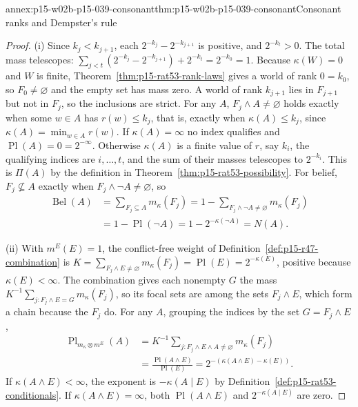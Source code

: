 \begin{annexitem}{annex:p15-w02b-p15-039-consonant}{thm:p15-w02b-p15-039-consonant}{Consonant ranks and Dempster's rule}
\begin{proof}
(i) Since \(k_j<k_{j+1}\), each \(2^{-k_j}-2^{-k_{j+1}}\) is positive, and
\(2^{-k_t}>0\).  The total mass telescopes:
\(\sum_{j<t}(2^{-k_j}-2^{-k_{j+1}})+2^{-k_t}=2^{-k_0}=1\).  Because
\(\kappa(W)=0\) and \(W\) is finite, Theorem~\ref{thm:p15-rat53-rank-laws}
gives a world of rank \(0=k_0\), so \(F_0\ne\varnothing\) and the empty set
has mass zero.  A world of rank \(k_{j+1}\) lies in \(F_{j+1}\) but not in
\(F_j\), so the inclusions are strict.  For any \(A\),
\(F_j\land A\ne\varnothing\) holds exactly when some \(w\in A\) has
\(r(w)\leq k_j\), that is, exactly when \(\kappa(A)\leq k_j\), since
\(\kappa(A)=\min_{w\in A}r(w)\).  If \(\kappa(A)=\infty\) no index
qualifies and \(\operatorname{Pl}(A)=0=2^{-\infty}\).  Otherwise
\(\kappa(A)\) is a finite value of \(r\), say \(k_i\), the qualifying
indices are \(i,\ldots,t\), and the sum of their masses telescopes to
\(2^{-k_i}\).  This is \(\Pi(A)\) by the definition in
Theorem~\ref{thm:p15-rat53-possibility}.  For belief,
\(F_j\not\subseteq A\) exactly when \(F_j\land\neg A\ne\varnothing\), so
\[
\begin{aligned}
 \operatorname{Bel}(A)&=\sum_{F_j\subseteq A}m_\kappa(F_j)
 =1-\sum_{F_j\land\neg A\ne\varnothing}m_\kappa(F_j)\\
 &=1-\operatorname{Pl}(\neg A)=1-2^{-\kappa(\neg A)}=N(A).
\end{aligned}
\]

(ii) With \(m^E(E)=1\), the conflict-free weight of
Definition~\ref{def:p15-r47-combination} is
\(K=\sum_{F_j\land E\ne\varnothing}m_\kappa(F_j)=\operatorname{Pl}(E)=2^{-\kappa(E)}\),
positive because \(\kappa(E)<\infty\).  The combination gives each nonempty
\(G\) the mass \(K^{-1}\sum_{j:F_j\land E=G}m_\kappa(F_j)\), so its focal
sets are among the sets \(F_j\land E\), which form a chain because the
\(F_j\) do.  For any \(A\), grouping the indices by the set
\(G=F_j\land E\),
\[
\begin{aligned}
 \operatorname{Pl}_{m_\kappa\otimes m^E}(A)
 &=K^{-1}\sum_{j:F_j\land E\land A\ne\varnothing}m_\kappa(F_j)\\
 &=\frac{\operatorname{Pl}(A\land E)}{\operatorname{Pl}(E)}
 =2^{-(\kappa(A\land E)-\kappa(E))}.
\end{aligned}
\]
If \(\kappa(A\land E)<\infty\), the exponent is \(-\kappa(A\mid E)\) by
Definition~\ref{def:p15-rat53-conditionals}.  If
\(\kappa(A\land E)=\infty\), both \(\operatorname{Pl}(A\land E)\) and
\(2^{-\kappa(A\mid E)}\) are zero.


\end{proof}
\end{annexitem}
